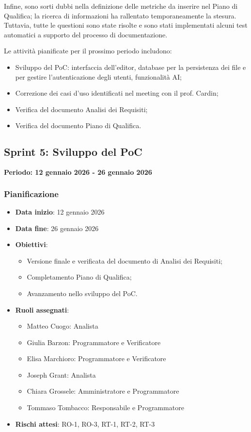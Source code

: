 \documentclass[11pt,a4paper]{article}
\begin{document}
Infine, sono sorti dubbi nella definizione delle metriche da inserire nel Piano di Qualifica; la ricerca di informazioni ha rallentato temporaneamente la stesura. Tuttavia, tutte le questioni sono state risolte e sono stati implementati alcuni test automatici a supporto del processo di documentazione.

Le attività pianificate per il prossimo periodo includono:
\begin{itemize}
    \item Sviluppo del PoC: interfaccia dell'editor, database per la persistenza dei file e per gestire l'autenticazione degli utenti, funzionalità AI;
    \item Correzione dei casi d'uso identificati nel meeting con il prof. Cardin;
    \item Verifica del documento Analisi dei Requisiti;
    \item Verifica del documento Piano di Qualifica.
\end{itemize}

\newpage
\subsection{Sprint 5: Sviluppo del PoC}
{\textbf{Periodo: 12 gennaio 2026 - 26 gennaio 2026}\par}

\subsubsection{Pianificazione}
\begin{itemize}
    \item \textbf{Data inizio}: 12 gennaio 2026
    \item \textbf{Data fine}: 26 gennaio 2026
    \item \textbf{Obiettivi}:
    \begin{itemize}
        \item Versione finale e verificata del documento di Analisi dei Requisiti;
        \item Completamento Piano di Qualifica;
        \item Avanzamento nello sviluppo del PoC.
    \end{itemize}
    \item \textbf{Ruoli assegnati}:
    \begin{itemize}
        \item Matteo Cuogo: Analista 
        \item Giulia Barzon: Programmatore e Verificatore
        \item Elisa Marchioro: Programmatore e Verificatore
        \item Joseph Grant: Analista
        \item Chiara Grossele: Amministratore e Programmatore
        \item Tommaso Tombacco: Responsabile e Programmatore 
    \end{itemize}
    \item \textbf{Rischi attesi}: RO-1, RO-3, RT-1, RT-2, RT-3
\end{itemize}
\end{document}
